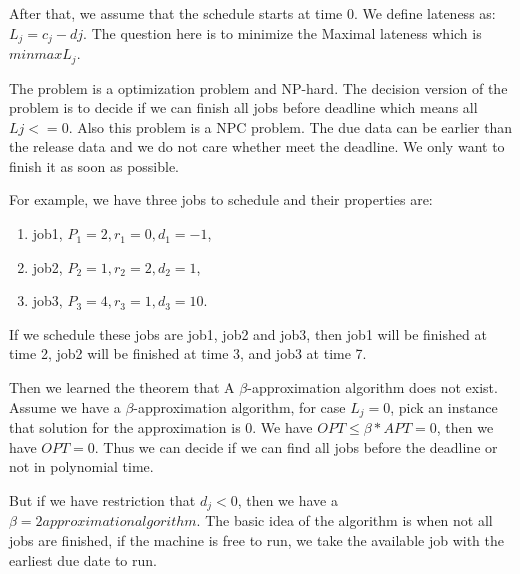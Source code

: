\documentclass[usletter]{article}
\begin{document}
After that, we assume that the schedule starts at time 0. We define lateness as: $L_{j} = c_{j} - d{j}$. 
The question here is to minimize the Maximal lateness which is $min{max{L_{j}}}$.

The problem is a optimization problem and NP-hard. The decision version of the problem is to decide if we can finish all jobs before deadline which means all $L{j} <= 0$. Also this problem is a NPC problem.
The due data can be earlier than the release data and we do not care whether meet the deadline. We only want to finish it as soon as possible.

For example, we have three jobs to schedule and their properties are:
\begin{enumerate}
	\item job1, $P_{1} = 2, r_{1} = 0, d_{1} = -1$,
	\item job2, $P_{2} = 1, r_{2} = 2, d_{2} = 1$,
	\item job3, $P_{3} = 4, r_{3} = 1, d_{3} = 10$. 
\end{enumerate}

If we schedule these jobs are job1, job2 and job3, then job1 will be finished at time 2, job2 will be finished at time 3, and job3 at time 7.

Then we learned the theorem that A $\beta$-approximation algorithm does not exist. Assume we have a $\beta$-approximation algorithm, for case $L_{j} = 0$, pick an instance that solution for the approximation is 0. We have $OPT \le \beta*APT = 0$, then we have $OPT = 0$. Thus we can decide if we can find all jobs before the deadline or not in polynomial time.

But if we have restriction that $d_{j} < 0$, then we have a $\beta = 2 approximation algorithm.$
The basic idea of the algorithm is when not all jobs are finished, if the machine is free to run, we take the available job with the earliest due date to run.



\end{document}

